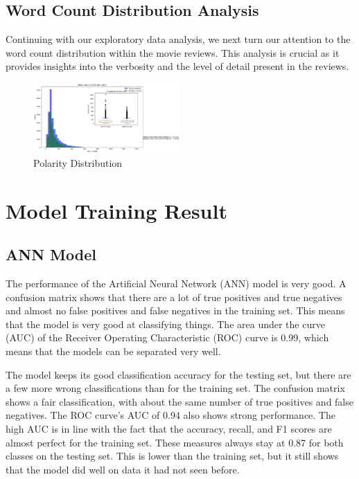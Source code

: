 \documentclass[11pt,a4paper]{article}
\begin{document}
\subsection{Word Count Distribution Analysis}
Continuing with our exploratory data analysis, we next turn our attention to the word count distribution within the movie reviews. This analysis is crucial as it provides insights into the verbosity and the level of detail present in the reviews.
\begin{figure}[ht]
    \centering
    \includegraphics[width=0.5\textwidth]{2.png}
    \caption{Polarity Distribution}
    \label{fig:polarity_distribution}
\end{figure}



\section{Model Training Result}

\subsection{ANN Model}

The performance of the Artificial Neural Network (ANN) model is very good. A confusion matrix shows that there are a lot of true positives and true negatives and almost no false positives and false negatives in the training set. This means that the model is very good at classifying things. The area under the curve (AUC) of the Receiver Operating Characteristic (ROC) curve is 0.99, which means that the models can be separated very well.

The model keeps its good classification accuracy for the testing set, but there are a few more wrong classifications than for the training set. The confusion matrix shows a fair classification, with about the same number of true positives and false negatives. The ROC curve's AUC of 0.94 also shows strong performance. The high AUC is in line with the fact that the accuracy, recall, and F1 scores are almost perfect for the training set. These measures always stay at 0.87 for both classes on the testing set. This is lower than the training set, but it still shows that the model did well on data it had not seen before.
\end{document}
